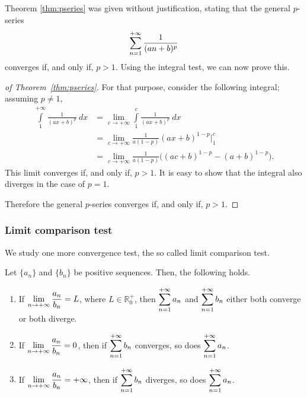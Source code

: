 \ifanalysis

Theorem \ref{thm:pseries} was given without justification, stating that the general $p$-series 
$$\displaystyle \sum_{n=1}^{+\infty} \frac 1{(an+b)^p}$$
converges if, and only if, $p>1$. Using the integral test, we can now prove this. 

\begin{proof}[of Theorem~\ref{thm:pseries}]
For that purpose, consider the following integral; assuming $p\neq 1$,
\begin{align*}
\int\limits_1^{+\infty} \frac1{(ax+b)^p}\ dx &= \lim_{c\to+\infty} \int\limits_1^c \frac1{(ax+b)^p}\ dx \\
		&= \lim_{c\to+\infty} \frac{1}{a(1-p)}(ax+b)^{1-p}\Big|_1^c\\
		&= \lim_{c\to+\infty} \frac{1}{a(1-p)}\big((ac+b)^{1-p}-(a+b)^{1-p}\big).
\end{align*}
This limit converges if, and only if, $p>1$. It is easy to show that the integral also diverges in the case of $p=1$. 

Therefore the general $p$-series converges if, and only if, $p>1$.
\end{proof}

\fi

\subsubsection{Limit comparison test}
We study one more convergence test, the so called limit comparison test. 

\begin{theorem}\label{thm:series_limit_compare}
Let $\{a_n\}$ and $\{b_n\}$ be positive sequences. Then, the following holds.
	\begin{enumerate}
		\item If $\displaystyle\lim_{n\to+\infty} \frac{a_n}{b_n} = L$, where $L\in\mathbb{R}_0^+$, then $\displaystyle \sum_{n=1}^{+\infty} a_n$ and $\displaystyle \sum_{n=1}^{+\infty} b_n$ either both converge or both diverge.
		\item	If $\displaystyle\lim_{n\to+\infty} \frac{a_n}{b_n} = 0$, then if $\displaystyle \sum_{n=1}^{+\infty} b_n$ converges,  so does $\displaystyle \sum_{n=1}^{+\infty} a_n$.
		\item	If $\displaystyle\lim_{n\to+\infty} \frac{a_n}{b_n} = +\infty$, then if $\displaystyle \sum_{n=1}^{+\infty} b_n$ diverges,  so does $\displaystyle \sum_{n=1}^{+\infty} a_n$.
	\end{enumerate}
	\end{theorem}
	
